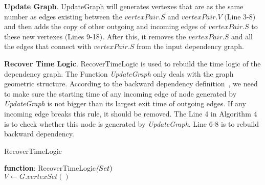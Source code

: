 \textbf{Update Graph}.
UpdateGraph will generates vertexes that are as the same number as edges existing between the $vertexPair.S$ and $vertexPair.V$ $($Line 3-8$)$ and then adds the copy of other outgoing and incoming edges of $vertexPair.S$ to these new vertexes $($Lines 9-18$)$. After this, it removes the $vertexPair.S$ and all the edges that connect with $vertexPair.S$ from the input dependency graph.

\textbf{Recover Time Logic}.
 RecoverTimeLogic is used to rebuild the time logic of the dependency graph. The Function \textit{UpdateGraph} only deals with the graph geometric structure. According to the backward dependency definition~\cite{backtracking,backtrackingfile,backtracking2}, we need to make sure the starting time of any incoming edge of node generated by \textit{UpdateGraph} is not bigger than its largest exit time of outgoing edges. If any incoming edge breaks this rule, it should be removed. The Line 4 in Algorithm 4 is to check whether this node is generated by \textit{UpdateGraph}. Line 6-8 is to rebuild backward dependency.  

\begin{algorithm}[b]
	\caption{RecoverTimeLogic}
	\textbf{function}: RecoverTimeLogic$\textit(Set)$\\
	$V \leftarrow G.vertexSet()$\;
	\label{alg:recover} 	
\end{algorithm}

